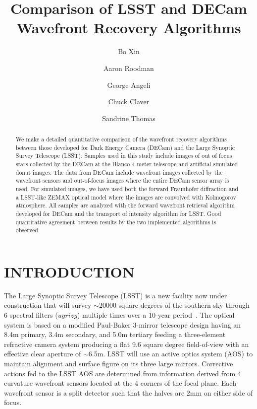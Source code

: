 \documentclass[]{spie}  %
\title{Comparison of LSST and DECam Wavefront Recovery Algorithms}
\author[a]{Bo Xin}
\author[b]{Aaron Roodman}
\author[a]{George Angeli}
\author[a]{Chuck Claver}
\author[a]{Sandrine Thomas}
\affil[a]{Large Synoptic Survey Telescope, Tucson AZ, USA}
\affil[b]{SLAC National Accelerator Laboratory, Stanford University, Menlo Park CA, USA}
\begin{document}
 
\maketitle

\begin{abstract}
We make a detailed quantitative comparison of the wavefront recovery algorithms between those developed for Dark Energy Camera (DECam) and the Large Synoptic Survey Telescope (LSST).
Samples used in this study include images of out of focus stars collected by the DECam at the Blanco 4-meter telescope and artificial simulated donut images. 
The data from DECam include wavefront images collected by the wavefront sensors and out-of-focus images where the entire DECam sensor array is used. For simulated images, we have used both the forward Fraunhofer diffraction and a LSST-like ZEMAX optical model where the images are convolved with Kolmogorov atmosphere.
All samples are analyzed with the forward wavefront retrieval algorithm developed for DECam and the transport of intensity algorithm for LSST.  Good quantitative agreement between results by the two implemented algorithms is observed.
\end{abstract}


\section{INTRODUCTION}
\label{sec:intro}  %
The Large Synoptic Survey Telescope (LSST) is a new facility now under
construction that will survey $\sim$20000 square degrees of the
southern sky through 6 spectral filters ($ugrizy$) multiple times over
a 10-year period~\cite{KahnSPIE, Ivezic08}.
The optical system is
based on a modified Paul-Baker 3-mirror
telescope design having an 8.4m primary, 3.4m secondary, and 5.0m
tertiary feeding a three-element refractive camera system producing a
flat 9.6 square degree field-of-view with an effective clear aperture of
$\sim$6.5m. 
LSST will use an active optics
system (AOS) to maintain alignment and surface figure on its
three large mirrors. Corrective actions fed to the LSST AOS are
determined from information derived from 4 curvature wavefront sensors located at the
4 corners of the focal plane. Each wavefront sensor is a split detector such that the halves
are 2mm on either side of focus. 
\end{document}
